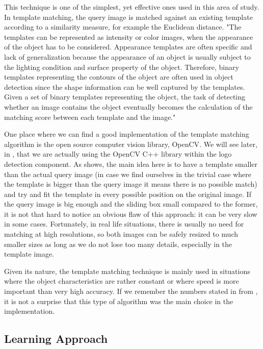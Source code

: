 This technique is one of the simplest, yet effective ones used in this area of
study. In template matching, the query image is matched against an existing
template according to a similarity measure, for example the Euclidean
distance. "The templates can be represented as intensity or color images, when the
appearance of the object has to be considered. Appearance templates are often
specific and lack of generalization because the appearance of an object is
usually subject to the lighting condition and surface property of the object.
Therefore, binary templates representing the contours of the object are often
used in object detection since the shape information can be well captured by
the templates. Given a set of binary templates representing the object, the
task of detecting whether an image contains the object eventually becomes the
calculation of the matching score between each template and the
image."\cite{improved-template}

One place where we can find a good implementation of the template matching
algorithm is the open source computer vision library, OpenCV\cite{open-cv}.
We will see later, in , that we
are actually using the OpenCV C++ library within the logo detection component. As
 shows, the main idea here is to
have a template smaller than the actual query image (in case we find ourselves
in the trivial case where the template is bigger than the query image it means
there is no possible match) and try and fit the template in every possible
position on the original image. If the query image is big enough and the
sliding box small compared to the former, it is not that hard to notice an
obvious flaw of this approach: it can be very slow in some cases. Fortunately,
in real life situations, there is usually no need for matching at high
resolutions, so both images can be safely resized to much smaller sizes as
long as we do not lose too many details, especially in the template image.


Given its nature, the template matching technique is mainly used in situations
where the object characteristics are rather constant or where speed is more
important than very high accuracy. If we remember the numbers stated in
 from ,
it is not a surprise that this type of algorithm was the main choice in the implementation.


\subsection{Learning Approach}
